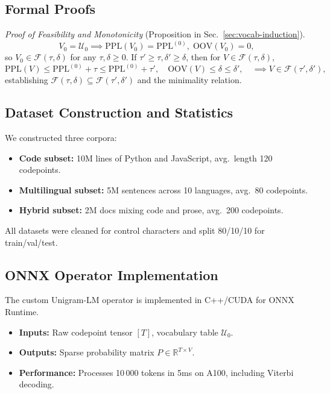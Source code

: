\subsection{Formal Proofs}
\label{sec:proofs}

\emph{Proof of Feasibility and Monotonicity} (Proposition in Sec.~\ref{sec:vocab-induction}).  
\[
V_0=\mathcal U_0\implies\mathrm{PPL}(V_0)=\mathrm{PPL}^{(0)},\;
\mathrm{OOV}(V_0)=0,
\]
so $V_0\in\mathcal F(\tau,\delta)$ for any $\tau,\delta\ge0$.  If $\tau'\ge\tau,\delta'\ge\delta$, then for $V\in\mathcal F(\tau,\delta)$,
\[
\mathrm{PPL}(V)\le \mathrm{PPL}^{(0)}+\tau\le \mathrm{PPL}^{(0)}+\tau',
\quad
\mathrm{OOV}(V)\le\delta\le\delta',
\quad\implies V\in\mathcal F(\tau',\delta'),
\]
establishing $\mathcal F(\tau,\delta)\subseteq\mathcal F(\tau',\delta')$ and the minimality relation.

\subsection{Dataset Construction and Statistics}
\label{sec:dataset}

We constructed three corpora:
\begin{itemize}[leftmargin=1.5em]
	\item \textbf{Code subset:} 10M lines of Python and JavaScript, avg.\ length 120 codepoints.
	\item \textbf{Multilingual subset:} 5M sentences across 10 languages, avg.\ 80 codepoints.
	\item \textbf{Hybrid subset:} 2M docs mixing code and prose, avg.\ 200 codepoints.
\end{itemize}
All datasets were cleaned for control characters and split 80/10/10 for train/val/test.

\subsection{ONNX Operator Implementation}
\label{sec:onnx-op}

The custom Unigram-LM operator is implemented in C++/CUDA for ONNX Runtime.  
\begin{itemize}[leftmargin=1.5em]
	\item \textbf{Inputs:} Raw codepoint tensor $[T]$, vocabulary table $\mathcal U_0$.
	\item \textbf{Outputs:} Sparse probability matrix $P\in\mathbb{R}^{T\times V}$.
	\item \textbf{Performance:} Processes 10\,000 tokens in 5ms on A100, including Viterbi decoding.
\end{itemize}

